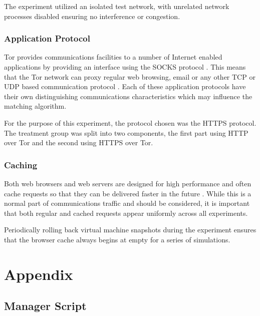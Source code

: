 \documentclass{ecuthesis}
\begin{document}
The experiment utilized an isolated test network, with unrelated network
processes disabled ensuring no interference or congestion.

\subsection{Application Protocol}

Tor provides communications facilities to a number of Internet enabled
applications by providing an interface using the SOCKS protocol
\parencite[17]{Dingledine:2004p314}. This means that the Tor network can proxy
regular web browsing, email or any other TCP or UDP based communication protocol
\parencite{website:socks}. Each of these application protocols have their own
distinguishing communications characteristics which may influence the matching
algorithm.

For the purpose of this experiment, the protocol chosen was the HTTPS protocol.
The treatment group was split into two components, the first part using HTTP
over Tor and the second using HTTPS over Tor.

\subsection{Caching}

Both web browsers and web servers are designed for high performance and often
cache requests so that they can be delivered faster in the future
\parencite{Caceres:1998p7419}. While this is a normal part of communications
traffic and should be considered, it is important that both regular and cached
requests appear uniformly across all experiments.

Periodically rolling back virtual machine snapshots during the experiment
ensures that the browser cache always begins at empty for a series of
simulations.





\chapter{Appendix}

\section{Manager Script}

\label{manager-script}

\end{document}

